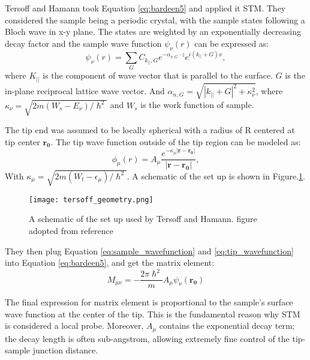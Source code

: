Tersoff and Hamann took Equation \ref{eq:bardeen5} and applied it \ac{STM}. They considered the sample being a periodic crystal, with the sample states following a Bloch wave in x-y plane. The states are weighted by an exponentially decreasing decay factor and the sample wave function $\psi_{\nu}(r)$ can be expressed as:
\begin{equation}
	\label{eq:sample_wavefunction}
	\psi_{\nu}(r) = \sum_G C_{k_{||},G} e^{-\alpha_{\nu,G}\cdot z }e^{i(k_{||}+G)x},
\end{equation}
where $K_{||}$ is the component of wave vector that is parallel to the surface. $G$ is the in-plane reciprocal lattice wave vector. And $\alpha_{n,G} = \sqrt{|k_{||}+G|^2 + \kappa_{\nu}^2}$, where $\kappa_{\nu} = \sqrt{2m(W_s - E_{\nu})/\hslash^2}$ and $W_s$ is the work function of sample. 

The tip end was assumed to be locally spherical with a radius of R centered at tip center $\mathbf{r_0}$. The tip wave function outside of the tip region can be modeled as:
\begin{equation}
	\label{eq:tip_wavefunction}
	\phi_{\mu}(r) = A_{\mu} \frac{e^{-\kappa_{\mu} |\mathbf{r-r_0}|}}{|\mathbf{r-r_0}|},
\end{equation}
With $\kappa_{\mu} = \sqrt{2m(W_t-\epsilon_{\mu})/\hslash^2}$. A schematic of the set up is shown in Figure.\ref{fig:tersoff}. 
\begin{figure}
	\centering
	\texttt{[image: tersoff\_geometry.png]}
	\caption{A schematic of the set up used by Tersoff and Hamann. figure adopted from reference \cite{tersoffTheoryScanningTunneling1985}}
	\label{fig:tersoff}
\end{figure}

They then plug Equation \ref{eq:sample_wavefunction} and \ref{eq:tip_wavefunction} into Equation \ref{eq:bardeen5}, and get the matrix element: 
\begin{equation}
	\label{eq:matrixelement_final}
	M_{\mu \nu} = -\frac{2\pi\hslash^2}{m}A_{\mu}\psi_{\nu}(\mathbf{r_0})
\end{equation}

The final expression for matrix element is proportional to the sample's surface wave function at the center of the tip. This is the fundamental reason why \ac{STM} is considered a local probe. Moreover, $A_{\mu}$ contains the exponential decay term; the decay length is often sub-angstrom, allowing extremely fine control of the tip-sample junction distance. 

